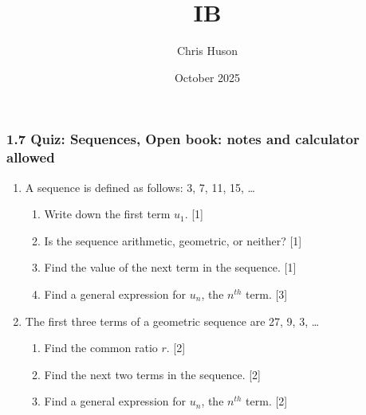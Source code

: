 \documentclass[12pt, twoside]{article}
\title{IB}
\author{Chris Huson}
\date{October 2025}
\begin{document}
\subsubsection*{1.7 Quiz: Sequences, Open book: notes and calculator allowed}
\begin{enumerate}[itemsep=0.5cm]
\item A sequence is defined as follows: 3, 7, 11, 15, \ldots
    \begin{enumerate}[itemsep=0.25cm]
        \item Write down the first term $u_1$. \hfill [1]
        \item Is the sequence arithmetic, geometric, or neither? \hfill [1]
        \item Find the value of the next term in the sequence. \hfill [1]
        \item Find a general expression for $u_n$, the $n^{th}$ term.  \hfill [3]
    \end{enumerate}
    
\newpage
\item The first three terms of a geometric sequence are 27, 9, 3, \ldots
    \begin{enumerate}[itemsep=0.25cm]
        \item Find the common ratio $r$. \hfill [2]
        \item Find the next two terms in the sequence. \hfill [2]
        \item Find a general expression for $u_n$, the $n^{th}$ term.  \hfill [2]
    \end{enumerate}
    

\end{enumerate}
\end{document}
